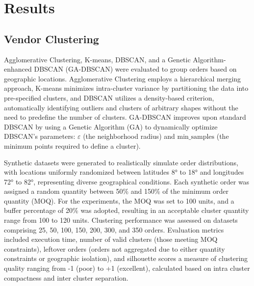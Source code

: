 \chapter{Results}
\section{Vendor Clustering}
Agglomerative Clustering\cite{ward1963hierarchical}, K-means\cite{macqueen1967some}, DBSCAN, and a Genetic Algorithm-enhanced DBSCAN (GA-DBSCAN) were evaluated to group orders based on geographic locations. Agglomerative Clustering employs a hierarchical merging approach, K-means minimizes intra-cluster variance by partitioning the data into pre-specified clusters, and DBSCAN utilizes a density-based criterion, automatically identifying outliers and clusters of arbitrary shapes without the need to predefine the number of clusters. GA-DBSCAN improves upon standard DBSCAN by using a Genetic Algorithm (GA) to dynamically optimize DBSCAN’s parameters: \(\varepsilon\) (the neighborhood radius) and \(\text{min\_samples}\) (the minimum points required to define a cluster).

Synthetic datasets were generated to realistically simulate order distributions, with locations uniformly randomized between latitudes 8° to 18° and longitudes 72° to 82°, representing diverse geographical conditions. Each synthetic order was assigned a random quantity between 50\% and 150\% of the minimum order quantity (MOQ). For the experiments, the MOQ was set to 100 units, and a buffer percentage of 20\% was adopted, resulting in an acceptable cluster quantity range from 100 to 120 units. Clustering performance was assessed on datasets comprising 25, 50, 100, 150, 200, 300, and 350 orders. Evaluation metrics included execution time, number of valid clusters (those meeting MOQ constraints), leftover orders (orders not aggregated due to either quantity constraints or geographic isolation), and silhouette scores a measure of clustering quality ranging from -1 (poor) to +1 (excellent), calculated based on intra cluster compactness and inter cluster separation.

